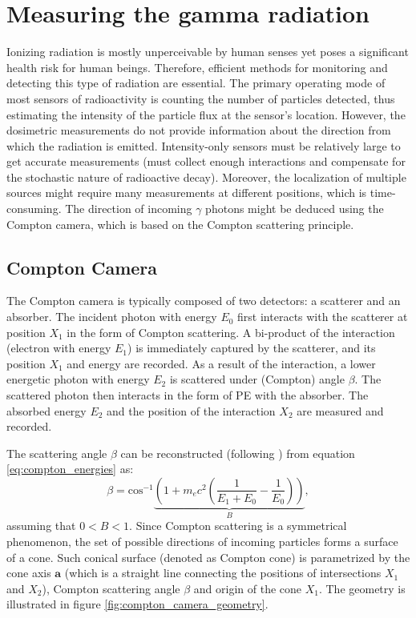 \section{Measuring the gamma radiation}
Ionizing radiation is mostly unperceivable by human senses yet poses a significant health risk for human beings. 
Therefore, efficient methods for monitoring and detecting this type of radiation are essential. 
The primary operating mode of most sensors of radioactivity is counting the number of particles detected,
thus estimating the intensity of the particle flux at the sensor's location. 
However, the dosimetric measurements do not provide information about the direction from which the radiation is emitted. 
Intensity-only sensors must be relatively large to get accurate measurements (must collect enough interactions and compensate for the stochastic nature of radioactive decay).
Moreover, the localization of multiple sources might require many measurements at different positions, which is time-consuming. 
The direction of incoming $\gamma$ photons might be deduced using
the Compton camera, which is based on the Compton scattering principle.

\subsection{Compton Camera}%
The Compton camera is typically composed of two detectors: a scatterer and an absorber.
The incident photon with energy $E_{0}$ first interacts with the scatterer at position $X_{1}$ in the form of Compton scattering.
A bi-product of the interaction (electron with energy $E_{1}$) is immediately captured by the scatterer, and its position $X_{1}$ and energy are recorded.
As a result of the interaction, a lower energetic photon with energy $E_{2}$ is scattered under (Compton) angle $\beta$.
The scattered photon then interacts in the form of \ac{PE} with the absorber.
The absorbed energy $E_{2}$ and the position of the interaction $X_{2}$ are measured and recorded.

The scattering angle $\beta$ can be reconstructed (following \cite{baca2021gamma}) from equation \ref{eq:compton_energies} as:
\begin{equation}
  \beta = \mathrm{cos}^{-1} 
  \underset{B}{\underbrace{\left (
   1+m_{e}c^{2} \left( \frac{1}{E_{1}+E_{0}} - \frac{1}{E_{0}}\right )  \right )
  }},
    \label{eq:compton_beta_formula}
\end{equation}
assuming that $0<B<1$.
Since Compton scattering is a symmetrical phenomenon,  the set of possible directions of incoming particles forms a surface of a cone.
Such conical surface (denoted as Compton cone) is parametrized by the cone axis $\mathbf{a}$ (which is a straight line connecting the positions of intersections $X_{1}$ and $X_{2}$), Compton scattering angle $\beta$ and origin of the cone $X_{1}$.
The geometry is illustrated in figure \ref{fig:compton_camera_geometry}.

